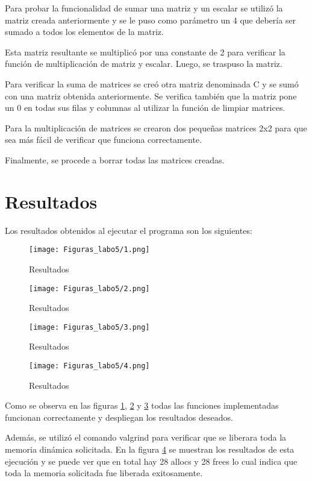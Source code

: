 \documentclass[
  letterpaper, 
  maincolor=black,
  sectioncolor=black!90,
  subsectioncolor=black!70,
  itemtextcolor=black!40,
]{fortysecondscv}
\begin{document}
Para probar la funcionalidad de sumar una matriz y un escalar se utilizó la matriz creada anteriormente y se le puso como parámetro un 4 que debería ser sumado a todos los elementos de la matriz. 

Esta matriz resultante se multiplicó por una constante de 2 para verificar la función de multiplicación de matriz y escalar. Luego, se traspuso la matriz. 

Para verificar la suma de matrices se creó otra matriz denominada C y se sumó con una matriz obtenida anteriormente. Se verifica también que la matriz pone un 0 en todas sus filas y columnas al utilizar la función de limpiar matrices.

Para la multiplicación de matrices se crearon dos pequeñas matrices 2x2 para que sea más fácil de verificar que funciona correctamente. 

Finalmente, se procede a borrar todas las matrices creadas. 

\section{Resultados}

Los resultados obtenidos al ejecutar el programa son los siguientes:

\begin{figure}[H]
	\centering
	\texttt{[image: Figuras\_labo5/1.png]}
	\caption{Resultados}
	\label{fig:1}
\end{figure}

\begin{figure}[H]
	\centering
	\texttt{[image: Figuras\_labo5/2.png]}
	\caption{Resultados}
	\label{fig:2}
\end{figure}

\begin{figure}[H]
	\centering
	\texttt{[image: Figuras\_labo5/3.png]}
	\caption{Resultados}
	\label{fig:3}
\end{figure}

\begin{figure}[H]
	\centering
	\texttt{[image: Figuras\_labo5/4.png]}
	\caption{Resultados}
	\label{fig:4}
\end{figure}

Como se observa en las figuras \ref{fig:1}, \ref{fig:2} y \ref{fig:3} todas las funciones implementadas funcionan correctamente y despliegan los resultados deseados. 

Además, se utilizó el comando valgrind para verificar que se liberara toda la memoria dinámica solicitada. En la figura \ref{fig:4} se muestran los resultados de esta ejecución y se puede ver que en total hay 28 allocs y 28 frees lo cual indica que toda la memoria solicitada fue liberada exitosamente.\\
\end{document}
